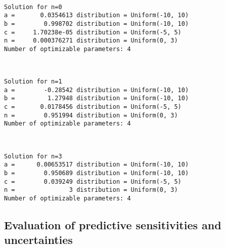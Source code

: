 \documentclass[11pt]{article}
\begin{document}
    \begin{center}
    \end{center}
    { \hspace*{\fill} \\}
    
    \begin{Verbatim}[commandchars=\\\{\}]
Solution for n=0
a =       0.0354613 distribution = Uniform(-10, 10)
b =        0.998702 distribution = Uniform(-10, 10)
c =     1.70238e-05 distribution = Uniform(-5, 5)
n =     0.000376271 distribution = Uniform(0, 3)
Number of optimizable parameters: 4
    \end{Verbatim}

    \begin{center}
    \end{center}
    { \hspace*{\fill} \\}
    
    \begin{Verbatim}[commandchars=\\\{\}]
Solution for n=1
a =        -0.28542 distribution = Uniform(-10, 10)
b =         1.27948 distribution = Uniform(-10, 10)
c =       0.0178456 distribution = Uniform(-5, 5)
n =        0.951994 distribution = Uniform(0, 3)
Number of optimizable parameters: 4
    \end{Verbatim}

    \begin{center}
    \end{center}
    { \hspace*{\fill} \\}
    
    \begin{Verbatim}[commandchars=\\\{\}]
Solution for n=3
a =      0.00653517 distribution = Uniform(-10, 10)
b =        0.950689 distribution = Uniform(-10, 10)
c =        0.039249 distribution = Uniform(-5, 5)
n =               3 distribution = Uniform(0, 3)
Number of optimizable parameters: 4
    \end{Verbatim}

    \hypertarget{evaluation-of-predictive-sensitivities-and-uncertainties}{%
\subsection{Evaluation of predictive sensitivities and
uncertainties}\label{evaluation-of-predictive-sensitivities-and-uncertainties}}
\end{document}
